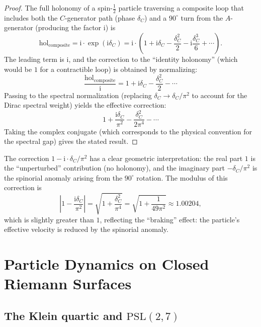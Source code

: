 \documentclass[12pt,a4paper]{article}
\theoremstyle{definition}
\theoremstyle{remark}
\newcommand{\PSL}{\mathrm{PSL}}
\newcommand{\hol}{\mathrm{hol}}
\newcommand{\ii}{\mathrm{i}}
\begin{document}
\begin{proof}
The full holonomy of a spin-$\frac{1}{2}$ particle traversing a composite loop that includes both the $C$-generator path (phase $\delta_C$) and a $90^\circ$ turn from the $A$-generator (producing the factor $\ii$) is
\begin{equation}
\hol_{\mathrm{composite}} = \ii \cdot \exp(\ii \delta_C) = \ii \cdot \left(1 + \ii\delta_C - \frac{\delta_C^2}{2} - \ii\frac{\delta_C^3}{6} + \cdots \right).
\end{equation}
The leading term is $\ii$, and the correction to the ``identity holonomy'' (which would be $1$ for a contractible loop) is obtained by normalizing:
\begin{equation}
\frac{\hol_{\mathrm{composite}}}{\ii} = 1 + \ii\delta_C - \frac{\delta_C^2}{2} - \cdots
\end{equation}
Passing to the spectral normalization (replacing $\delta_C \to \delta_C/\pi^2$ to account for the Dirac spectral weight) yields the effective correction:
\begin{equation}
1 + \frac{\ii\delta_C}{\pi^2} - \frac{\delta_C^2}{2\pi^4} - \cdots
\end{equation}
Taking the complex conjugate (which corresponds to the physical convention for the spectral gap) gives the stated result.
\end{proof}

The correction $1 - \ii \cdot \delta_C/\pi^2$ has a clear geometric interpretation: the real part $1$ is the ``unperturbed'' contribution (no holonomy), and the imaginary part $-\delta_C/\pi^2$ is the spinorial anomaly arising from the $90^\circ$ rotation. The modulus of this correction is
\begin{equation}
\left|1 - \frac{\ii \delta_C}{\pi^2}\right| = \sqrt{1 + \frac{\delta_C^2}{\pi^4}} = \sqrt{1 + \frac{1}{49\pi^2}} \approx 1.00204,
\end{equation}
which is slightly greater than $1$, reflecting the ``braking'' effect: the particle's effective velocity is reduced by the spinorial anomaly.

\section{Particle Dynamics on Closed Riemann Surfaces}
\label{sec:dynamics}

\subsection{The Klein quartic and $\PSL(2,7)$}
\end{document}
